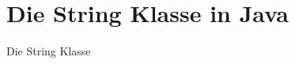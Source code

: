 \documentclass[a4paper, 12pt]{report}
\begin{document}
	\bsremovechaptertitle
	\chapter*{Die String Klasse in Java}
	Die String Klasse 
\end{document}
